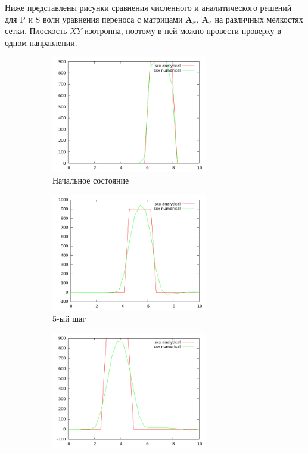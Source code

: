 	Ниже представлены рисунки сравнения численного и аналитического решений для P и S волн уравнения переноса с матрицами $\mathbf{A}_x$, $\mathbf{A}_z$ на различных мелкостях сетки.
	Плоскость $XY$ изотропна, поэтому в ней можно провести проверку в одном направлении.
\begin{figure}[H]
\begin{subfigure}[b]{0.5\textwidth}
\centering
\includegraphics[width=0.75\textwidth]{png/veryfication/0.8/p-wave-along-x0.png}
\caption{Начальное состояние}
\end{subfigure}
\begin{subfigure}[b]{0.5\textwidth}
\centering
\includegraphics[width=0.75\textwidth]{png/veryfication/0.8/p-wave-along-x5.png}
\caption{5-ый шаг}
\end{subfigure}
\begin{subfigure}[b]{0.5\textwidth}
\centering
\includegraphics[width=0.75\textwidth]{png/veryfication/0.8/p-wave-along-x10.png}

\end{subfigure}
\end{figure}
